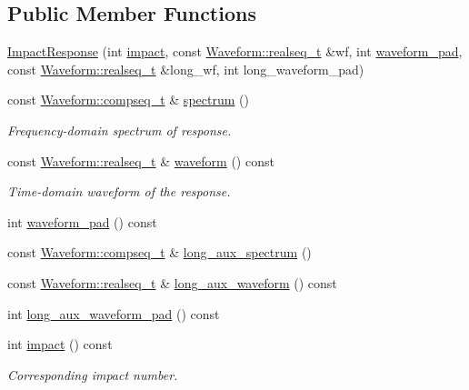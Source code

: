 \subsection*{Public Member Functions}
\begin{DoxyCompactItemize}
\item 
\hyperlink{class_wire_cell_1_1_gen_1_1_impact_response_ad10810e7b4dfbc2ab17cd79ff3b962f5}{Impact\+Response} (int \hyperlink{class_wire_cell_1_1_gen_1_1_impact_response_a664b5b110cc63973d357bcf9c9f155d8}{impact}, const \hyperlink{namespace_wire_cell_1_1_waveform_a479175e541c8545e87cd8063b74b6956}{Waveform\+::realseq\+\_\+t} \&wf, int \hyperlink{class_wire_cell_1_1_gen_1_1_impact_response_a11a5437cb671e68e35244757d92dda56}{waveform\+\_\+pad}, const \hyperlink{namespace_wire_cell_1_1_waveform_a479175e541c8545e87cd8063b74b6956}{Waveform\+::realseq\+\_\+t} \&long\+\_\+wf, int long\+\_\+waveform\+\_\+pad)
\item 
const \hyperlink{namespace_wire_cell_1_1_waveform_a7e4a8d371f774438bb360e7d1dcb583a}{Waveform\+::compseq\+\_\+t} \& \hyperlink{class_wire_cell_1_1_gen_1_1_impact_response_a8bd5c0dbe10911359e29892d4f1380c1}{spectrum} ()
\begin{DoxyCompactList}\small\item\em Frequency-\/domain spectrum of response. \end{DoxyCompactList}\item 
const \hyperlink{namespace_wire_cell_1_1_waveform_a479175e541c8545e87cd8063b74b6956}{Waveform\+::realseq\+\_\+t} \& \hyperlink{class_wire_cell_1_1_gen_1_1_impact_response_a50a66f592c1eb71279cbf6981fd5f8e5}{waveform} () const
\begin{DoxyCompactList}\small\item\em Time-\/domain waveform of the response. \end{DoxyCompactList}\item 
int \hyperlink{class_wire_cell_1_1_gen_1_1_impact_response_a11a5437cb671e68e35244757d92dda56}{waveform\+\_\+pad} () const
\item 
const \hyperlink{namespace_wire_cell_1_1_waveform_a7e4a8d371f774438bb360e7d1dcb583a}{Waveform\+::compseq\+\_\+t} \& \hyperlink{class_wire_cell_1_1_gen_1_1_impact_response_a8d8bd238c6286a8e6c70dc7a543a5ca3}{long\+\_\+aux\+\_\+spectrum} ()
\item 
const \hyperlink{namespace_wire_cell_1_1_waveform_a479175e541c8545e87cd8063b74b6956}{Waveform\+::realseq\+\_\+t} \& \hyperlink{class_wire_cell_1_1_gen_1_1_impact_response_ad722252b3658fea7cfc38d1d1dee3787}{long\+\_\+aux\+\_\+waveform} () const
\item 
int \hyperlink{class_wire_cell_1_1_gen_1_1_impact_response_a0ea37ecd9dfc58b77c11dd8599128f14}{long\+\_\+aux\+\_\+waveform\+\_\+pad} () const
\item 
int \hyperlink{class_wire_cell_1_1_gen_1_1_impact_response_a664b5b110cc63973d357bcf9c9f155d8}{impact} () const
\begin{DoxyCompactList}\small\item\em Corresponding impact number. \end{DoxyCompactList}\end{DoxyCompactItemize}
